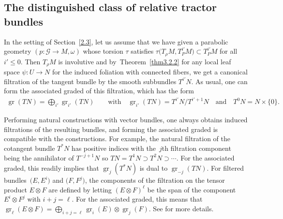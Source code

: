 \documentclass[pdftex]{sigma}
\numberwithin{equation}{section}
\def\Cal{\mathcal}
\newcommand{\x}{\times}
\newcommand{\om}{\omega}
\newcommand{\gr}{\operatorname{gr}}
\begin{document}
\subsection{The distinguished class of relative tractor bundles}\label{3.3}
In the setting of Section~\ref{2.3}, let us assume that we have given a parabolic geometry
${(p\colon \Cal G\!\to\! M,\om)}$ whose torsion $\tau$ satisfies $\tau\bigl(T_\rho M,T^{i'}_PM\bigr)\subset
T^{i'}_PM$ for all $i'\leq 0$. Then $T_\rho M$ is involutive and by~Theorem~\ref{thm3.2.2} for any local leaf space $\psi\colon U\to N$ for the induced foliation with
connected fibers, we get a canonical filtration of the tangent bundle by the smooth
subbundles $T^{i'}N$. As usual, one can form the associated graded of this
filtration, which has the form
\begin{gather*}
 \gr(TN)=\bigoplus_{i'}\gr_{i'}(TN) \qquad\text{with}\quad \gr_{i'}(TN)=T^{i'}N/T^{i'+1}N
\quad\text{and}\quad T^0N=N\x \{0\}.
\end{gather*}

Performing natural constructions with vector bundles, one always obtains induced
filtrations of the resulting bundles, and forming the associated graded is compatible
with the constructions. For example, the natural filtration of the cotangent bundle
$T^*N$ has positive indices with the~$j$th filtration component being the annihilator
of $T^{-j+1}N$ so $TN=T^1N\supset T^2N\supset\cdots$. For the associated graded, this
readily implies that $\gr_j(T^*N)$ is dual to $\gr_{-j}(TN)$. For filtered bundles~$\bigl(E,E^i\bigr)$
and $\bigl(F,F^j\bigr)$, the components of the filtration on the tensor product
$E\otimes F$ are defined by letting $(E\otimes F)^\ell$ be the span of the component
$E^i\otimes F^j$ with $i+j=\ell$. For the associated graded, this means that
$\gr_\ell(E\otimes F)=\bigoplus_{i+j=\ell}\gr_i(E)\otimes\gr_j(F)$. See
\cite[Section 3.1.1]{book} for more details.
\end{document}
